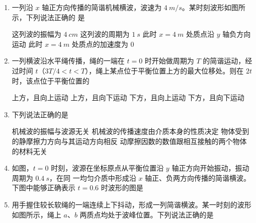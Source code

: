 

\begin{enumerate}
	\item
{}
 一列沿 $ x $ 轴正方向传播的简谐机械横波，波速为 $ 4 \ m /s $。某时刻波形如图所示，下列说法正确的
是  
\begin{figure}[h!]
	\centering
	
\end{figure}

\fourchoices
{这列波的振幅为 $ 4 \ cm $}
{这列波的周期为 $ 1 \ s $}
{此时 $ x=4 \ m $ 处质点沿 $ y $ 轴负方向运动}
{此时 $ x=4 \ m $ 处质点的加速度为 $ 0 $}



\item 
{}
一列横波沿水平绳传播，绳的一端在 $ t=0 $ 时开始做周期为 $ T $ 的简谐运动，经过时间 $ t $（$ 3 T /4<t  <T $），绳上某点位于平衡位置上方的最大位移处。则在 $ 2t $ 时，该点位于平衡位置的  

\fourchoices
{上方，且向上运动}
{上方，且向下运动}
{下方，且向上运动}
{下方，且向下运动}


\item 
{}
下列说法正确的是  

\fourchoices
{机械波的振幅与波源无关}
{机械波的传播速度由介质本身的性质决定}
{物体受到的静摩擦力方向与其运动方向相反}
{动摩擦因数的数值跟相互接触的两个物体的材料无关}


\item 
{}
如图，$ t=0 $ 时刻，波源在坐标原点从平衡位置沿 $ y $ 轴正方向开始振动，振动周期为 $ 0.4 \ s $，在同
一均匀介质中形成沿 $ x $ 轴正、负两方向传播的简谐横波。下图中能够正确表示 $ t=0.6 $ 时波形的图是  

\pfourchoices
{}
{}
{}
{}


\item 
{}
用手握住较长软绳的一端连续上下抖动，形成一列简谐横波。某一时刻的波形如图所示，绳上
$ a $、$ b $ 两质点均处于波峰位置。下列说法正确的是  
\begin{figure}[h!]
	\centering
	
\end{figure}


\end{enumerate}
